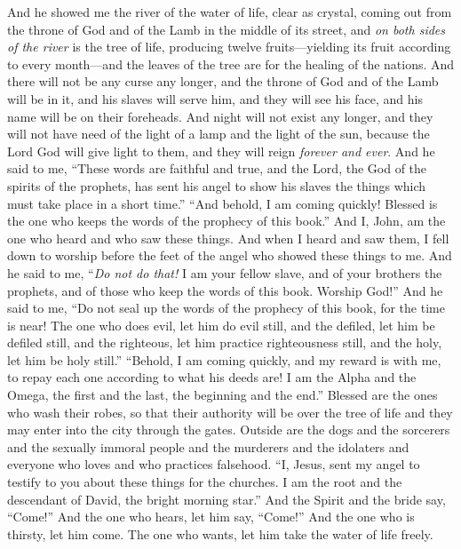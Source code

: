 \begin{biblechapter} %
 And he showed me the river of the water of life, clear as crystal, coming out from the throne of God and of the Lamb
\verse in the middle of its street, and \textit{on both sides of the river} is the tree of life, producing twelve fruits—yielding its fruit according to every month—and the leaves of the tree are for the healing of the nations.
\verse And there will not be any curse any longer, and the throne of God and of the Lamb will be in it, and his slaves will serve him,
\verse and they will see his face, and his name will be on their foreheads.
\verse And night will not exist any longer, and they will not have need of the light of a lamp and the light of the sun, because the Lord God will give light to them, and they will reign \textit{forever and ever}.
 And he said to me, “These words are faithful and true, and the Lord, the God of the spirits of the prophets, has sent his angel to show his slaves the things which must take place in a short time.”
\verse “And behold, I am coming quickly! Blessed is the one who keeps the words of the prophecy of this book.”
\verse And I, John, am the one who heard and who saw these things. And when I heard and saw them, I fell down to worship before the feet of the angel who showed these things to me.
\verse And he said to me, “\textit{Do not do that!} I am your fellow slave, and of your brothers the prophets, and of those who keep the words of this book. Worship God!”
\verse And he said to me, “Do not seal up the words of the prophecy of this book, for the time is near!
\verse The one who does evil, let him do evil still, and the defiled, let him be defiled still, and the righteous, let him practice righteousness still, and the holy, let him be holy still.”
\verse “Behold, I am coming quickly, and my reward is with me, to repay each one according to what his deeds are!
\verse I am the Alpha and the Omega, the first and the last, the beginning and the end.”
\verse Blessed are the ones who wash their robes, so that their authority will be over the tree of life and they may enter into the city through the gates.
\verse Outside are the dogs and the sorcerers and the sexually immoral people and the murderers and the idolaters and everyone who loves and who practices falsehood.
\verse “I, Jesus, sent my angel to testify to you about these things for the churches. I am the root and the descendant of David, the bright morning star.”
 And the Spirit and the bride say, “Come!” And the one who hears, let him say, “Come!” And the one who is thirsty, let him come. The one who wants, let him take the water of life freely.

\end{biblechapter}
